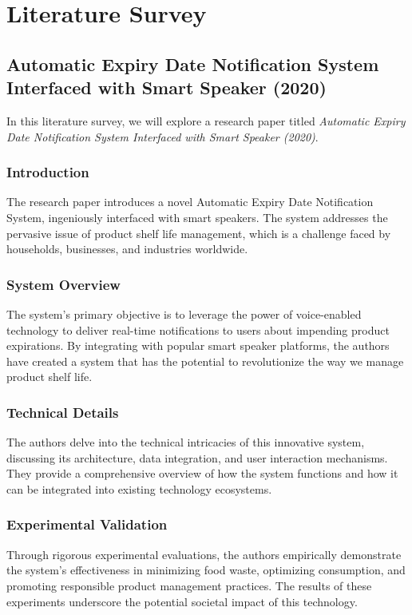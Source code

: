 \chapter{Literature Survey}

\section{Automatic Expiry Date Notification System Interfaced with Smart Speaker (2020)} 
In this literature survey, we will explore a research paper titled \textit{Automatic Expiry Date Notification System Interfaced with Smart Speaker (2020)}.

\subsection{Introduction}
The research paper introduces a novel Automatic Expiry Date Notification System, ingeniously interfaced with smart speakers. The system addresses the pervasive issue of product shelf life management, which is a challenge faced by households, businesses, and industries worldwide.

\subsection{System Overview}
The system's primary objective is to leverage the power of voice-enabled technology to deliver real-time notifications to users about impending product expirations. By integrating with popular smart speaker platforms, the authors have created a system that has the potential to revolutionize the way we manage product shelf life.

\subsection{Technical Details}
The authors delve into the technical intricacies of this innovative system, discussing its architecture, data integration, and user interaction mechanisms. They provide a comprehensive overview of how the system functions and how it can be integrated into existing technology ecosystems.

\subsection{Experimental Validation}
Through rigorous experimental evaluations, the authors empirically demonstrate the system's effectiveness in minimizing food waste, optimizing consumption, and promoting responsible product management practices. The results of these experiments underscore the potential societal impact of this technology.

